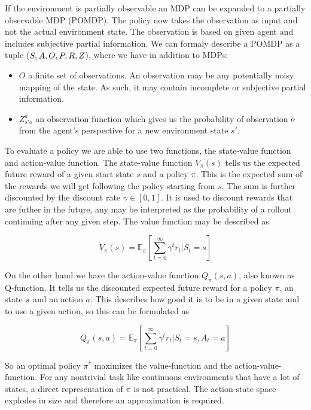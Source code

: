 If the environment is partially observable an MDP can be expanded to a partially observable MDP (POMDP). The policy now takes the observation as input and not the actual environment state. The observation is based on given agent and includes subjective partial information. We can formaly describe a POMDP as a tuple ($S, A, O, P, R, Z$), where we have in addition to MDPs:
\begin{itemize}[noitemsep,nolistsep]
	\item $O$ a finite set of observations. An observation may be any potentially noisy mapping of the state. As such, it may contain incomplete or subjective partial information.
	\item $Z_{s'o}^a$ an observation function which gives us the probability of observation $o$ from the agent's perspective for a new environment state $s'$.
\end{itemize}

To evaluate a policy we are able to use two functions, the state-value function and action-value function. The state-value function $V_\pi(s)$ tells us the expected future reward of a given start state $s$ and a policy $\pi$. This is the expected sum of the rewards we will get following the policy starting from $s$. The sum is further discounted by the discount rate $\gamma \in [0,1]$. It is used to discount rewards that are futher in the future, any may be interpreted as the probability of a rollout continuing after any given step. The value function may be described as

\begin{equation}
    V_\pi(s) = \mathbb{E}_\pi \left [ \sum_{t=0}^\infty \gamma^t r_t | S_t = s\right ] \nonumber
\end{equation} \par

On the other hand we have the action-value function $Q_\pi(s,a)$, also known as Q-function. It tells us the discounted expected future reward for a policy $\pi$, an state $s$ and an action $a$. This describes how good it is to be in a given state and to use a given action, so this can be formulated as

\begin{equation}
    Q_\pi(s,a) = \mathbb{E}_\pi [\sum_{t=0}^\infty \gamma^t r_t | S_t = s, A_t = a] \nonumber
\end{equation} \par

So an optimal policy $\pi^*$ maximizes the value-function and the action-value-function. For any nontrivial task like continuous environments that have a lot of states, a direct representation of $\pi$ is not practical. The action-state space explodes in size and therefore an approximation is required. \par

